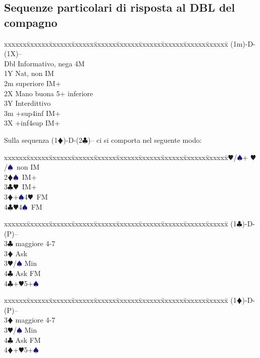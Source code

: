 \documentclass[a4paper,italian]{article}
\newcommand{\BC}{\textcolor{OliveGreen}{$\clubsuit$}}
\newcommand{\BD}{\textcolor{RedOrange}{$\vardiamondsuit$}}
\newcommand{\BH}{\textcolor{Red2}{$\varheartsuit${}}}
\newcommand{\BS}{\textcolor{MidnightBlue}{$\spadesuit${}}}
\newenvironment{bidtable}
{\begin{tabbing}

    xxxxxx\=xxxxxx\=xxxxxx\=xxxxxx\=xxxxxx\=xxxxxx\=xxxxxx\=xxxxxx\=xxxxxx\=xxxxxx\=\kill}
{\end{tabbing} }%
\newenvironment{sviluppi}
{\begin{tcolorbox}[colframe=azzurro,title=Sviluppi particolari]}
    {
\end{tcolorbox} }%
\begin{document}
\begin{multicols}{2}
    \subsection{Sequenze particolari di risposta al DBL del compagno}

    \begin{bidtable}
        (1m)-D-(1X)--\+\\
        Dbl \> Informativo, nega 4M\\
        1Y \> Nat, non IM\\
        2m  superiore IM+\\
        2X \> Mano buona 5+ inferiore\\
        3Y \> Interdittivo\\
        3m +sup4inf IM+\\
        3X +inf4sup IM+
    \end{bidtable}

    \begin{sviluppi}
        Sulla sequenza (1\BD)-D-(2\BC)-- ci si comporta nel seguente modo:
        \begin{bidtable}
            2\BH/\BS{}+ \BH/\BS\ non IM\\
            2\BD{}\BS\ IM+\\
            3\BC{}\BH\ IM+\\
            3\BD{}+\BS4\BH\ FM\\
            4\BC{}\BH4\BS\ FM
        \end{bidtable}

    \end{sviluppi}

    \begin{bidtable}
        (1\BC)-D-(P)--\+\\
        3\BC {} maggiore 4-7\+\\
        3\BD \> Ask\\
        3\BH/\BS \> Min\+\\
        4\BC \> Ask FM\-\\
        4\BC {}+\BH 5+\BS
    \end{bidtable}

    \begin{bidtable}
        (1\BD)-D-(P)--\+\\
        3\BD {} maggiore 4-7\+\\
        3\BH/\BS \> Min\\
        4\BC \> Ask FM\-\\
        4\BD {}+\BH 5+\BS \-
    \end{bidtable}


\end{multicols}
\end{document}
